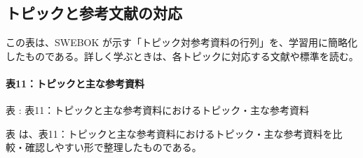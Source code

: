 \subsection{トピックと参考文献の対応}
この表は、SWEBOK が示す「トピック対参考資料の行列」を、学習用に簡略化したものである。詳しく学ぶときは、各トピックに対応する文献や標準を読む。

\paragraph{表11：トピックと主な参考資料}
\par\smallskip\noindent{}\label{tab:ch10-11}表 \thetable: 表11：トピックと主な参考資料におけるトピック・主な参考資料\par\smallskip
表 \thetable は、表11：トピックと主な参考資料におけるトピック・主な参考資料を比較・確認しやすい形で整理したものである。\par\smallskip
